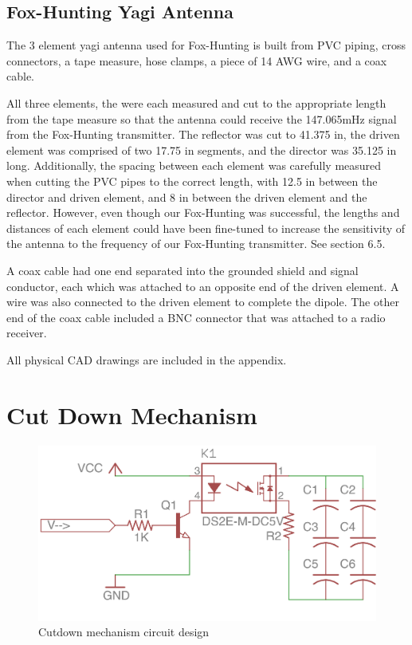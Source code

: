 \documentclass[12pt,]{article}
\begin{document}
\subsection{Fox-Hunting Yagi Antenna}\label{fox-hunting-yagi-antenna}

The 3 element yagi antenna used for Fox-Hunting is built from PVC
piping, cross connectors, a tape measure, hose clamps, a piece of 14 AWG
wire, and a coax cable.

All three elements, the were each measured and cut to the appropriate
length from the tape measure so that the antenna could receive the
147.065mHz signal from the Fox-Hunting transmitter. The reflector was
cut to 41.375 in, the driven element was comprised of two 17.75 in
segments, and the director was 35.125 in long. Additionally, the spacing
between each element was carefully measured when cutting the PVC pipes
to the correct length, with 12.5 in between the director and driven
element, and 8 in between the driven element and the reflector. However,
even though our Fox-Hunting was successful, the lengths and distances of
each element could have been fine-tuned to increase the sensitivity of
the antenna to the frequency of our Fox-Hunting transmitter. See section
6.5.

A coax cable had one end separated into the grounded shield and signal
conductor, each which was attached to an opposite end of the driven
element. A wire was also connected to the driven element to complete the
dipole. The other end of the coax cable included a BNC connector that
was attached to a radio receiver.

All physical CAD drawings are included in the appendix.

\section{Cut Down Mechanism}\label{cut-down-mechanism}

\begin{figure}[h]

{\centering \includegraphics{assets/cutdown} 

}

\caption{\label{fig:figs} Cutdown mechanism circuit design}\label{fig:cutdown_diagram}
\end{figure}
\end{document}
